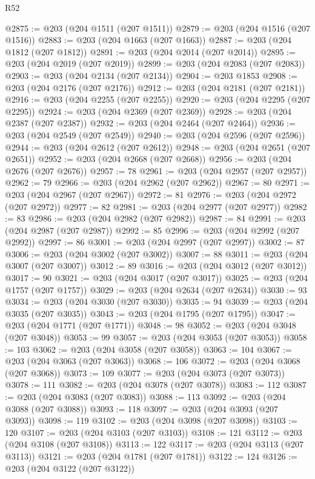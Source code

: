 \begin{lexlean}{R52}
\begin{coremodule}
{{{{{{{{{{{{{{{{{{{{{{{{{{{{{{{{{{{{{{{{{{{{{{{{{{{{{{{{{{{{{{{{{{{{{{{{{{{{{{{{{{{{{{{{{{{{{{{{{{{{{{{{{{{{{{{{{{{{{{{{{{{{{{{{{{{{{{{{{{{{{{{{{{{{{{{{{{{{{{{{{{{{{{{{{{{{{{{{{{{{{{{{{{{{{{{{{{{{{{@2875 := @203 (@204 @1511 (@207 @1511))
@2879 := @203 (@204 @1516 (@207 @1516))
@2883 := @203 (@204 @1663 (@207 @1663))
@2887 := @203 (@204 @1812 (@207 @1812))
@2891 := @203 (@204 @2014 (@207 @2014))
@2895 := @203 (@204 @2019 (@207 @2019))
@2899 := @203 (@204 @2083 (@207 @2083))
@2903 := @203 (@204 @2134 (@207 @2134))
@2904 := @203 @1853
@2908 := @203 (@204 @2176 (@207 @2176))
@2912 := @203 (@204 @2181 (@207 @2181))
@2916 := @203 (@204 @2255 (@207 @2255))
@2920 := @203 (@204 @2295 (@207 @2295))
@2924 := @203 (@204 @2369 (@207 @2369))
@2928 := @203 (@204 @2387 (@207 @2387))
@2932 := @203 (@204 @2464 (@207 @2464))
@2936 := @203 (@204 @2549 (@207 @2549))
@2940 := @203 (@204 @2596 (@207 @2596))
@2944 := @203 (@204 @2612 (@207 @2612))
@2948 := @203 (@204 @2651 (@207 @2651))
@2952 := @203 (@204 @2668 (@207 @2668))
@2956 := @203 (@204 @2676 (@207 @2676))
@2957 := 78
@2961 := @203 (@204 @2957 (@207 @2957))
@2962 := 79
@2966 := @203 (@204 @2962 (@207 @2962))
@2967 := 80
@2971 := @203 (@204 @2967 (@207 @2967))
@2972 := 81
@2976 := @203 (@204 @2972 (@207 @2972))
@2977 := 82
@2981 := @203 (@204 @2977 (@207 @2977))
@2982 := 83
@2986 := @203 (@204 @2982 (@207 @2982))
@2987 := 84
@2991 := @203 (@204 @2987 (@207 @2987))
@2992 := 85
@2996 := @203 (@204 @2992 (@207 @2992))
@2997 := 86
@3001 := @203 (@204 @2997 (@207 @2997))
@3002 := 87
@3006 := @203 (@204 @3002 (@207 @3002))
@3007 := 88
@3011 := @203 (@204 @3007 (@207 @3007))
@3012 := 89
@3016 := @203 (@204 @3012 (@207 @3012))
@3017 := 90
@3021 := @203 (@204 @3017 (@207 @3017))
@3025 := @203 (@204 @1757 (@207 @1757))
@3029 := @203 (@204 @2634 (@207 @2634))
@3030 := 93
@3034 := @203 (@204 @3030 (@207 @3030))
@3035 := 94
@3039 := @203 (@204 @3035 (@207 @3035))
@3043 := @203 (@204 @1795 (@207 @1795))
@3047 := @203 (@204 @1771 (@207 @1771))
@3048 := 98
@3052 := @203 (@204 @3048 (@207 @3048))
@3053 := 99
@3057 := @203 (@204 @3053 (@207 @3053))
@3058 := 103
@3062 := @203 (@204 @3058 (@207 @3058))
@3063 := 104
@3067 := @203 (@204 @3063 (@207 @3063))
@3068 := 106
@3072 := @203 (@204 @3068 (@207 @3068))
@3073 := 109
@3077 := @203 (@204 @3073 (@207 @3073))
@3078 := 111
@3082 := @203 (@204 @3078 (@207 @3078))
@3083 := 112
@3087 := @203 (@204 @3083 (@207 @3083))
@3088 := 113
@3092 := @203 (@204 @3088 (@207 @3088))
@3093 := 118
@3097 := @203 (@204 @3093 (@207 @3093))
@3098 := 119
@3102 := @203 (@204 @3098 (@207 @3098))
@3103 := 120
@3107 := @203 (@204 @3103 (@207 @3103))
@3108 := 121
@3112 := @203 (@204 @3108 (@207 @3108))
@3113 := 122
@3117 := @203 (@204 @3113 (@207 @3113))
@3121 := @203 (@204 @1781 (@207 @1781))
@3122 := 124
@3126 := @203 (@204 @3122 (@207 @3122))
}}}}}}}}}}}}}}}}}}}}}}}}}}}}}}}}}}}}}}}}}}}}}}}}}}}}}}}}}}}}}}}}}}}}}}}}}}}}}}}}}}}}}}}}}}}}}}}}}}}}}}}}}}}}}}}}}}}}}}}}}}}}}}}}}}}}}}}}}}}}}}}}}}}}}}}}}}}}}}}}}}}}}}}}}}}}}}}}}}}}}}}}}}}}}}}}}}}}}}
\end{coremodule}
\end{lexlean}
